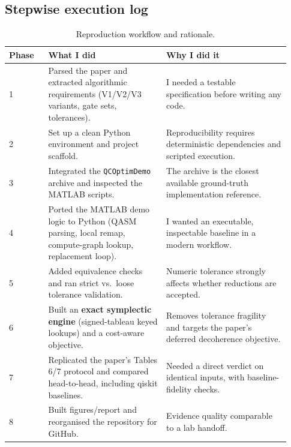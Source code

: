 \documentclass[11pt,a4paper]{article}
\begin{document}
\subsection{Stepwise execution log}
\begin{table}[H]
\centering
\caption{Reproduction workflow and rationale.}
\label{tab:workflow}
\begin{tabular}{p{0.13\linewidth}p{0.39\linewidth}p{0.41\linewidth}}
\toprule
Phase & What I did & Why I did it \\
\midrule
1 & Parsed the paper and extracted algorithmic requirements (V1/V2/V3 variants, gate sets, tolerances). & I needed a testable specification before writing any code. \\
2 & Set up a clean Python environment and project scaffold. & Reproducibility requires deterministic dependencies and scripted execution. \\
3 & Integrated the \texttt{QCOptimDemo} archive and inspected the MATLAB scripts. & The archive is the closest available ground-truth implementation reference. \\
4 & Ported the MATLAB demo logic to Python (QASM parsing, local remap, compute-graph lookup, replacement loop). & I wanted an executable, inspectable baseline in a modern workflow. \\
5 & Added equivalence checks and ran strict vs.\ loose tolerance validation. & Numeric tolerance strongly affects whether reductions are accepted. \\
6 & Built an \textbf{exact symplectic engine} (signed-tableau keyed lookups) and a cost-aware objective. & Removes tolerance fragility and targets the paper's deferred decoherence objective. \\
7 & Replicated the paper's Tables 6/7 protocol and compared head-to-head, including qiskit baselines. & Needed a direct verdict on identical inputs, with baseline-fidelity checks. \\
8 & Built figures/report and reorganised the repository for GitHub. & Evidence quality comparable to a lab handoff. \\
\bottomrule
\end{tabular}
\end{table}
\end{document}
